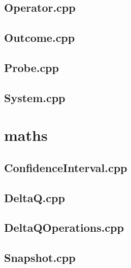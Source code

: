 \subsection{Operator.cpp}


\subsection{Outcome.cpp}


\subsection{Probe.cpp}


\subsection{System.cpp}


\section{maths}

\subsection{ConfidenceInterval.cpp}


\subsection{DeltaQ.cpp}


\subsection{DeltaQOperations.cpp}


\subsection{Snapshot.cpp}


